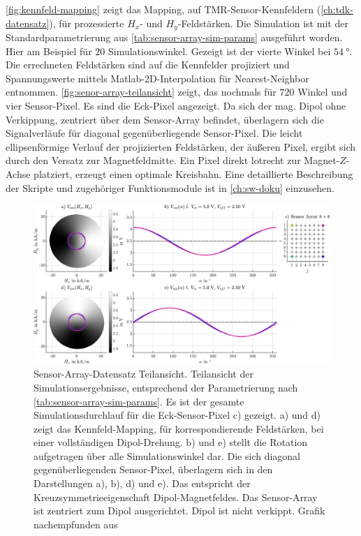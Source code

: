 \autoref{fig:kennfeld-mapping} zeigt das Mapping, auf TMR-Sensor-Kennfeldern (\autoref{ch:tdk-datensatz}), für prozessierte $H_x$- und $H_y$-Feldstärken. Die Simulation ist mit der Standardparametrierung aus \autoref{tab:sensor-array-sim-params} ausgeführt worden. Hier am Beispiel für $20$ Simulationswinkel. Gezeigt ist der vierte Winkel bei $\SI{54}{\degree}$. Die errechneten Feldstärken sind auf die Kennfelder projiziert und Spannungswerte mittels Matlab-2D-Interpolation für Nearest-Neighbor entnommen. \autoref{fig:senor-array-teilansicht} zeigt, das nochmals für $720$ Winkel und vier Sensor-Pixel. Es sind die Eck-Pixel angezeigt. Da sich der mag. Dipol ohne Verkippung, zentriert über dem Sensor-Array befindet, überlagern sich die Signalverläufe für diagonal gegenüberliegende Sensor-Pixel. Die leicht ellipsenförmige Verlauf der projizierten Feldstärken, der äußeren Pixel, ergibt sich durch den Versatz zur Magnetfeldmitte. Ein Pixel direkt lotrecht zur Magnet-$Z$-Achse platziert, erzeugt einen optimale Kreisbahn. Eine detaillierte Beschreibung der Skripte und zugehöriger Funktionsmodule ist in \autoref{ch:sw-doku} einzusehen.


\vspace{5mm}
\begin{figure}[bph]
	\centering
	\includegraphics[width=\linewidth]{appendix/images/5-Sensor-Array-Sim-Imp/Senor-Array-Teilansicht}
	\caption[Sensor-Array-Datensatz Teilansicht]{Sensor-Array-Datensatz Teilansicht. Teilansicht der Simulationsergebnisse, entsprechend der Parametrierung nach \autoref{tab:sensor-array-sim-params}. Es ist der gesamte Simulationsdurchlauf für die Eck-Sensor-Pixel c) gezeigt. a) und d) zeigt das Kennfeld-Mapping, für korrespondierende Feldstärken, bei einer vollständigen Dipol-Drehung. b) und e) stellt die Rotation aufgetragen über alle Simulationswinkel dar. Die sich diagonal gegenüberliegenden Sensor-Pixel, überlagern sich in den Darstellungen a), b), d) und e). Das entspricht der Kreuzsymmetrieeigenschaft Dipol-Magnetfeldes. Das Sensor-Array ist zentriert zum Dipol ausgerichtet. Dipol ist nicht verkippt. Grafik nachempfunden aus \cite{Schuethe2019}}
	\label{fig:senor-array-teilansicht}
\end{figure}
